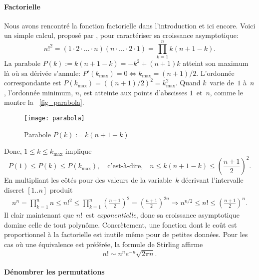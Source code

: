 \paragraph{Factorielle}

Nous avons rencontré la fonction factorielle dans l'introduction et
ici encore. Voici un simple calcul, proposé par
\cite{GrahamKnuthPatashnik_1994}, pour caractériser sa croissance
asymptotique:
\begin{equation*}
n!^2 = (1 \cdot 2 \cdot \ldots \cdot n) (n \cdot \ldots \cdot 2 \cdot
1) = \prod_{k=1}^{n}{k(n+1-k)}.
\end{equation*}
La parabole \(P(k) := k(n+1-k) = -k^2 + (n+1)k\) atteint son maximum
là où sa dérivée s'annule: \(P'(k_{\max}) = 0 \Leftrightarrow
k_{\max}=(n+1)/2\). L'ordonnée correspondante est \(P(k_{\max}) =
((n+1)/2)^2 = k_{\max}^2\). Quand \(k\)~varie de~\(1\) à~\(n\),
l'ordonnée minimum, \(n\), est atteinte aux points d'abscisses
\(1\)~et~\(n\), comme le montre la \fig~\vref{fig_parabola}.
\begin{figure}
\centering
\texttt{[image: parabola]}
\caption{Parabole \(P(k) := k(n+1-k)\)\label{fig_parabola}}
\end{figure}
Donc, \(1 \leqslant k \leqslant k_{\max}\) implique
\begin{equation*}
P(1) \leqslant P(k) \leqslant P(k_{\max}),\quad \text{c'est-à-dire,}
\quad n \leqslant k(n+1-k) \leqslant \left(\frac{n+1}{2}\right)^2.
\end{equation*}
En multipliant les côtés pour des valeurs de la variable~\(k\)
décrivant l'intervalle discret \([1..n]\) produit
\begin{gather*}
n^n = \prod_{k=1}^{n}{n} \leqslant n!^2 
\leqslant
\prod_{k=1}^{n}{\left(\!\frac{n+1}{2}\!\right)^2} \!\!=
\left(\!\frac{n+1}{2}\!\right)^{2n}
\!\!\!\Rightarrow\!
n^{n/2} \leqslant n! \leqslant \left(\!\frac{n+1}{2}\!\right)^n.
\end{gather*}
Il clair maintenant que \(n!\)~est \emph{exponentielle}, donc sa
croissance asymptotique domine celle de tout polynôme. Concrètement,
une fonction dont le coût est proportionnel à la factorielle est
inutile même pour de petites données. Pour les cas où une équivalence
est préférée, la formule de Stirling
affirme
\begin{equation}
n! \sim n^n e^{-n} \sqrt{2\pi n}.\label{eq_Stirling}
\end{equation}

\paragraph{Dénombrer les permutations}

